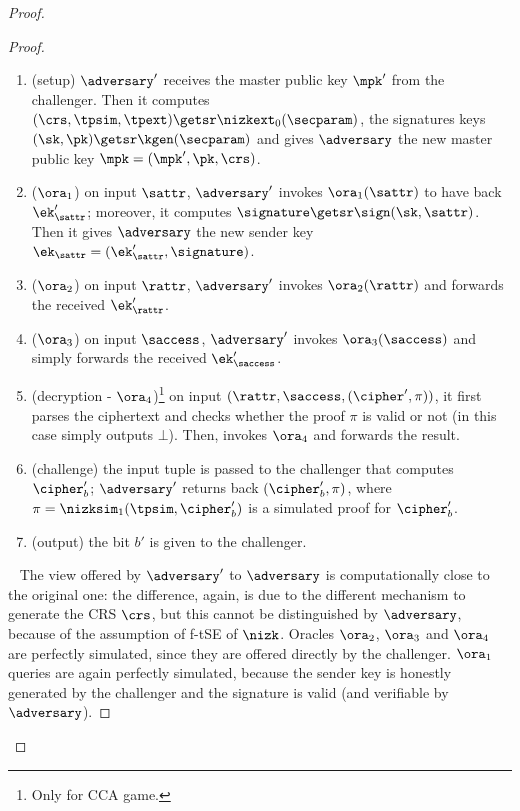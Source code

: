 \begin{proof}
\begin{lemma}
\begin{proof}
            \begin{enumerate}
                \item (setup) $\adversary'$ receives the master public key $\mpk'$ from the challenger. Then it computes $(\crs,\tpsim,\tpext)\getsr\nizkext_0(\secparam)$, the signatures keys $(\sk, \pk) \getsr \kgen(\secparam)$ and gives $\adversary$ the new master public key $\mpk = (\mpk', \pk, \crs)$.
                \item ($\ora_1$) on input $\sattr$, $\adversary'$ invokes $\ora_1(\sattr)$ to have back $\ek'_\sattr$; moreover, it computes $\signature \getsr \sign(\sk, \sattr)$. Then it gives $\adversary$ the new sender key $\ek_\sattr = (\ek'_\sattr, \signature)$.
                \item ($\ora_2$) on input $\rattr$, $\adversary'$ invokes $\ora_2(\rattr)$ and forwards the received $\ek'_\rattr$.
                \item ($\ora_3$) on input $\saccess$, $\adversary'$ invokes $\ora_3(\saccess)$ and simply forwards the received $\ek'_\saccess$.
                \item (decryption - $\ora_4$)\footnote{Only for CCA game.} on input $(\rattr, \saccess, (\cipher', \pi))$, it first parses the ciphertext and checks whether the proof $\pi$ is valid or not (in this case simply outputs $\bot$). Then, invokes $\ora_4$ and forwards the result.
                \item (challenge) the input tuple is passed to the challenger that computes $\cipher'_b$; $\adversary'$ returns back $(\cipher'_b, \pi)$, where $\pi = \nizksim_1(\tpsim, \cipher'_b)$ is a simulated proof for $\cipher'_b$.
                \item (output) the bit $b'$ is given to the challenger.
            \end{enumerate}
            ~\newline
            The view offered by $\adversary'$ to $\adversary$ is computationally close to the original one: the difference, again, is due to the different mechanism to generate the CRS $\crs$, but this cannot be distinguished by $\adversary$, because of the assumption of f-tSE of $\nizk$.
            Oracles $\ora_2$, $\ora_3$ and $\ora_4$ are perfectly simulated, since they are offered directly by the challenger.
            $\ora_1$ queries are again perfectly simulated, because the sender key is honestly generated by the challenger and the signature is valid (and verifiable by $\adversary$).
        \end{proof}
    \end{lemma}


\end{proof}
